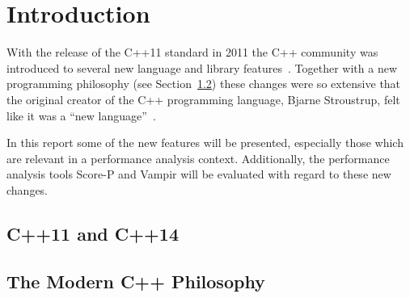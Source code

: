 \section{Introduction}

With the release of the C++11 standard in 2011 the C++ community was introduced to several new language and library features~\cite{cpp11std}. Together with a new programming philosophy (see Section~\ref{subs:intro_philosophy}) these changes were so extensive that the original creator of the C++ programming language, Bjarne Stroustrup, felt like it was a ``new language''~\cite{tcpp}.

In this report some of the new features will be presented, especially those which are relevant in a performance analysis context. Additionally, the performance analysis tools Score-P and Vampir will be evaluated with regard to these new changes.

\subsection{C++11 and C++14}

\subsection{The Modern C++ Philosophy}\label{subs:intro_philosophy}

